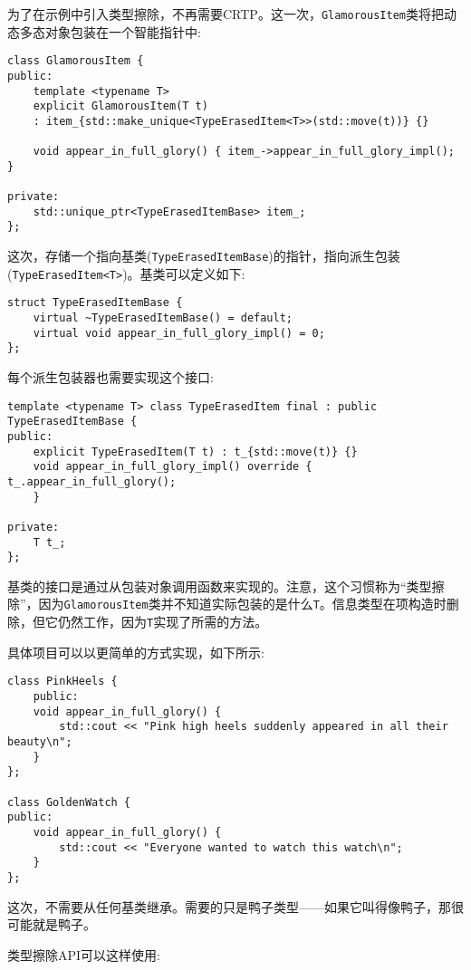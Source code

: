 为了在示例中引入类型擦除，不再需要CRTP。这一次，\texttt{GlamorousItem}类将把动态多态对象包装在一个智能指针中:

\begin{lstlisting}[style=styleCXX]
class GlamorousItem {
public:
	template <typename T>
	explicit GlamorousItem(T t)
	: item_{std::make_unique<TypeErasedItem<T>>(std::move(t))} {}
	
	void appear_in_full_glory() { item_->appear_in_full_glory_impl(); }
	
private:
	std::unique_ptr<TypeErasedItemBase> item_;
};
\end{lstlisting}

这次，存储一个指向基类(\texttt{TypeErasedItemBase})的指针，指向派生包装(\texttt{TypeErasedItem<T>})。基类可以定义如下:

\begin{lstlisting}[style=styleCXX]
struct TypeErasedItemBase {
	virtual ~TypeErasedItemBase() = default;
	virtual void appear_in_full_glory_impl() = 0;
};
\end{lstlisting}

每个派生包装器也需要实现这个接口:

\begin{lstlisting}[style=styleCXX]
template <typename T> class TypeErasedItem final : public
TypeErasedItemBase {
public:
	explicit TypeErasedItem(T t) : t_{std::move(t)} {}
	void appear_in_full_glory_impl() override { t_.appear_in_full_glory();
	}

private:
	T t_;
};
\end{lstlisting}

基类的接口是通过从包装对象调用函数来实现的。注意，这个习惯称为“类型擦除”，因为\texttt{GlamorousItem}类并不知道实际包装的是什么\texttt{T}。信息类型在项构造时删除，但它仍然工作，因为\texttt{T}实现了所需的方法。

具体项目可以以更简单的方式实现，如下所示:

\begin{lstlisting}[style=styleCXX]
class PinkHeels {
	public:
	void appear_in_full_glory() {
		std::cout << "Pink high heels suddenly appeared in all their beauty\n";
    }
};

class GoldenWatch {
public:
	void appear_in_full_glory() {
		std::cout << "Everyone wanted to watch this watch\n";
	}
};
\end{lstlisting}

这次，不需要从任何基类继承。需要的只是鸭子类型——如果它叫得像鸭子，那很可能就是鸭子。

类型擦除API可以这样使用:

